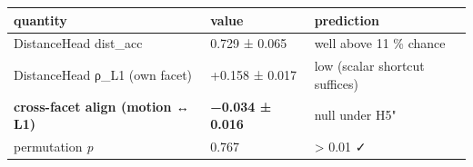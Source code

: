 \begin{longtable}[]{@{}lll@{}}
\toprule
\begin{minipage}[b]{0.30\columnwidth}\raggedright
quantity\strut
\end{minipage} & \begin{minipage}[b]{0.30\columnwidth}\raggedright
value\strut
\end{minipage} & \begin{minipage}[b]{0.30\columnwidth}\raggedright
prediction\strut
\end{minipage}\tabularnewline
\midrule
\endhead
\begin{minipage}[t]{0.30\columnwidth}\raggedright
DistanceHead dist\_acc\strut
\end{minipage} & \begin{minipage}[t]{0.30\columnwidth}\raggedright
0.729 ± 0.065\strut
\end{minipage} & \begin{minipage}[t]{0.30\columnwidth}\raggedright
well above 11 \% chance\strut
\end{minipage}\tabularnewline
\begin{minipage}[t]{0.30\columnwidth}\raggedright
DistanceHead ρ\_L1 (own facet)\strut
\end{minipage} & \begin{minipage}[t]{0.30\columnwidth}\raggedright
+0.158 ± 0.017\strut
\end{minipage} & \begin{minipage}[t]{0.30\columnwidth}\raggedright
low (scalar shortcut suffices)\strut
\end{minipage}\tabularnewline
\begin{minipage}[t]{0.30\columnwidth}\raggedright
\textbf{cross-facet align (motion ↔ L1)}\strut
\end{minipage} & \begin{minipage}[t]{0.30\columnwidth}\raggedright
\textbf{−0.034 ± 0.016}\strut
\end{minipage} & \begin{minipage}[t]{0.30\columnwidth}\raggedright
null under H5"\strut
\end{minipage}\tabularnewline
\begin{minipage}[t]{0.30\columnwidth}\raggedright
permutation \emph{p}\strut
\end{minipage} & \begin{minipage}[t]{0.30\columnwidth}\raggedright
0.767\strut
\end{minipage} & \begin{minipage}[t]{0.30\columnwidth}\raggedright
\textgreater{} 0.01 ✓\strut
\end{minipage}\tabularnewline
\bottomrule
\end{longtable}

